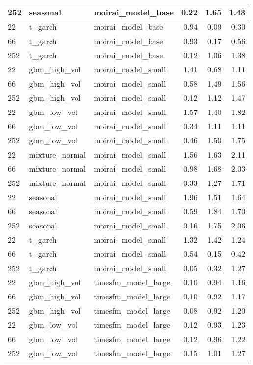 {\begin{tabular}{lllrrr}
252 & seasonal & moirai\_model\_base & 0.22 & 1.65 & 1.43 \\
\midrule
22 & t\_garch & moirai\_model\_base & 0.94 & 0.09 & 0.30 \\
66 & t\_garch & moirai\_model\_base & 0.93 & 0.17 & 0.56 \\
252 & t\_garch & moirai\_model\_base & 0.12 & 1.06 & 1.38 \\
\midrule
22 & gbm\_high\_vol & moirai\_model\_small & 1.41 & 0.68 & 1.11 \\
66 & gbm\_high\_vol & moirai\_model\_small & 0.58 & 1.49 & 1.56 \\
252 & gbm\_high\_vol & moirai\_model\_small & 0.12 & 1.12 & 1.47 \\
\midrule
22 & gbm\_low\_vol & moirai\_model\_small & 1.57 & 1.40 & 1.82 \\
66 & gbm\_low\_vol & moirai\_model\_small & 0.34 & 1.11 & 1.11 \\
252 & gbm\_low\_vol & moirai\_model\_small & 0.46 & 1.50 & 1.75 \\
\midrule
22 & mixture\_normal & moirai\_model\_small & 1.56 & 1.63 & 2.11 \\
66 & mixture\_normal & moirai\_model\_small & 0.98 & 1.68 & 2.03 \\
252 & mixture\_normal & moirai\_model\_small & 0.33 & 1.27 & 1.71 \\
\midrule
22 & seasonal & moirai\_model\_small & 1.96 & 1.51 & 1.64 \\
66 & seasonal & moirai\_model\_small & 0.59 & 1.84 & 1.70 \\
252 & seasonal & moirai\_model\_small & 0.16 & 1.75 & 2.06 \\
\midrule
22 & t\_garch & moirai\_model\_small & 1.32 & 1.42 & 1.24 \\
66 & t\_garch & moirai\_model\_small & 0.54 & 0.15 & 0.42 \\
252 & t\_garch & moirai\_model\_small & 0.05 & 0.32 & 1.27 \\
\midrule
22 & gbm\_high\_vol & timesfm\_model\_large & 0.10 & 0.94 & 1.16 \\
66 & gbm\_high\_vol & timesfm\_model\_large & 0.10 & 0.92 & 1.17 \\
252 & gbm\_high\_vol & timesfm\_model\_large & 0.08 & 0.92 & 1.20 \\
\midrule
22 & gbm\_low\_vol & timesfm\_model\_large & 0.12 & 0.93 & 1.23 \\
66 & gbm\_low\_vol & timesfm\_model\_large & 0.12 & 0.96 & 1.22 \\
252 & gbm\_low\_vol & timesfm\_model\_large & 0.15 & 1.01 & 1.27 \\

\end{tabular}}
